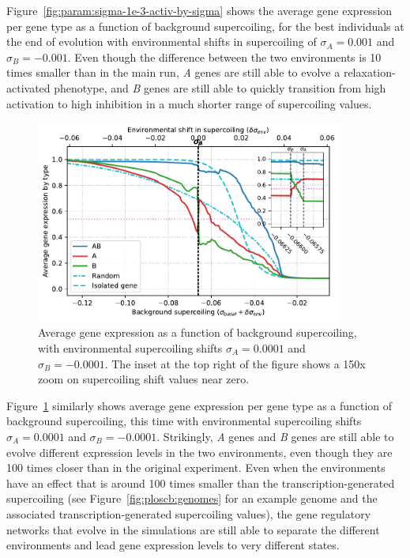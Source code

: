 Figure~\ref{fig:param:sigma-1e-3-activ-by-sigma} shows the average gene expression per gene type as a function of background supercoiling, for the best individuals at the end of evolution with environmental shifts in supercoiling of $\sigma_A = 0.001$ and $\sigma_B = -0.001$.
Even though the difference between the two environments is 10 times smaller than in the main run, \emph{A} genes are still able to evolve a relaxation-activated phenotype, and \emph{B} genes are still able to quickly transition from high activation to high inhibition in a much shorter range of supercoiling values.

\begin{figure}
\centering
\includegraphics[width=0.9\textwidth]{param/sigma/sigma-1e-4/activity_sigmas_avg.pdf}
\caption[Average gene expression as a function of background supercoiling, with an absolute environmental supercoiling shift of 0.0001]{Average gene expression as a function of background supercoiling, with environmental supercoiling shifts $\sigma_A = 0.0001$ and $\sigma_B = -0.0001$.
The inset at the top right of the figure shows a 150x zoom on supercoiling shift values near zero.}
\label{fig:param:sigma-1e-4-activ-by-sigma}
\end{figure}

Figure~\ref{fig:param:sigma-1e-4-activ-by-sigma} similarly shows average gene expression per gene type as a function of background supercoiling, this time with environmental supercoiling shifts $\sigma_A = 0.0001$ and $\sigma_B = -0.0001$.
Strikingly, \emph{A} genes and \emph{B} genes are still able to evolve different expression levels in the two environments, even though they are 100 times closer than in the original experiment.
Even when the environments have an effect that is around 100 times smaller than the transcription-generated supercoiling (see Figure~\ref{fig:ploscb:genomes} for an example genome and the associated transcription-generated supercoiling values), the gene regulatory networks that evolve in the simulations are still able to separate the different environments and lead gene expression levels to very different states.



